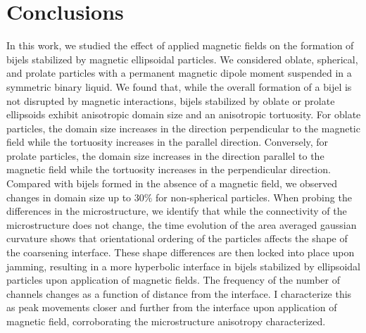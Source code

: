 \section{Conclusions}

In this work, we studied the effect of applied magnetic fields on the
formation of bijels stabilized by magnetic ellipsoidal particles. We
considered oblate, spherical, and prolate particles with a permanent
magnetic dipole moment suspended in a symmetric binary liquid. We found
that, while the overall formation of a bijel is not disrupted by
magnetic interactions, bijels stabilized by oblate or prolate ellipsoids
exhibit anisotropic domain size and an anisotropic tortuosity. For
oblate particles, the domain size increases in the direction
perpendicular to the magnetic field while the tortuosity increases in
the parallel direction. Conversely, for prolate particles, the domain
size increases in the direction parallel to the magnetic field while the
tortuosity increases in the perpendicular direction. Compared with
bijels formed in the absence of a magnetic field, we observed changes in
domain size up to \(30\%\) for non-spherical particles. When probing
the differences in the microstructure, we identify that while the
connectivity of the microstructure does not change, 
the time evolution of the area averaged gaussian curvature shows that
orientational ordering of the particles affects the shape of the
coarsening interface. These shape differences are then locked into place
upon jamming, resulting in a more hyperbolic interface in bijels stabilized
by ellipsoidal particles upon application of magnetic fields. The frequency 
of the number of channels changes as a function of distance from the interface. I
characterize this as peak movements closer and further from the interface upon application of magnetic
field, corroborating the microstructure anisotropy characterized.

